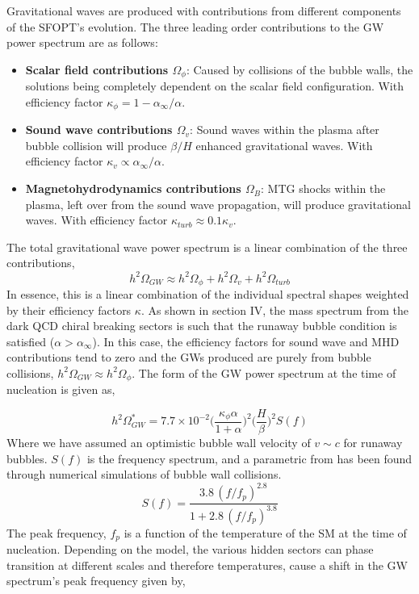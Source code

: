 \documentclass[nofootinbib,twocolumn,preprintnumbers]{revtex4-1}
\begin{document}
Gravitational waves are produced with contributions from different components of the SFOPT's evolution.  The three leading order contributions to the GW power spectrum are as follows:
\begin{itemize}
\item \textbf{Scalar field contributions $\Omega_{\phi}$}: Caused by collisions of the bubble walls, the solutions being completely dependent on the scalar field configuration. With efficiency factor $\kappa_{\phi} = 1 - \alpha_{\infty}/\alpha$.
\item \textbf{Sound wave contributions $\Omega_{v}$}: Sound waves within the plasma after bubble collision will produce $\beta/H$  enhanced gravitational waves. With efficiency factor $\kappa_{v} \propto \alpha_{\infty}/\alpha$.
\item \textbf{Magnetohydrodynamics contributions $\Omega_{B}$}: MTG shocks within the plasma, left over from the sound wave propagation, will produce gravitational waves. With efficiency factor $\kappa_{
turb} \approx 0.1 \kappa_{v} $.
\end{itemize}
The total gravitational wave power spectrum  is a linear combination of the three contributions,
\begin{equation}
h^2\Omega_{GW} \approx h^2\Omega_{\phi} + h^2\Omega_{v} + h^2\Omega_{turb} 
\end{equation}
In essence, this is a linear combination of the individual spectral shapes weighted by their efficiency factors $\kappa$. As shown in section IV, the mass spectrum from the dark QCD chiral breaking sectors is such that the runaway bubble condition is satisfied ($\alpha >\alpha_{\infty}$). In this case, the efficiency factors for sound wave and MHD contributions tend to zero and the GWs produced are purely from bubble collisions, $h^2\Omega_{GW} \approx h^2\Omega_{\phi}$.  The form of the GW power spectrum at the time of nucleation is given as,

\begin{equation}
h^2\Omega_{GW}^* = 7.7\times 10^{-2} \bigg( \frac{\kappa_{\phi} \alpha}{1 + \alpha} \bigg)^2 \bigg( \frac{H}{\beta} \bigg)^2  S(f)
\end{equation}
Where we have assumed an optimistic bubble wall velocity of $v \sim c$ for runaway bubbles. $S(f)$ is the  frequency spectrum, and a parametric from has been found through numerical simulations of bubble wall collisions.
\begin{equation}
S(f) = \frac{3.8 \,(f/f_p)^{2.8}}{1 + 2.8\,(f/f_p)^{3.8}}
\end{equation}
The peak frequency, $f_{p}$ is a function of the temperature of the SM at the time of nucleation. Depending on the model, the various hidden sectors can phase transition at different scales and therefore temperatures, cause a shift in the GW spectrum's peak frequency given by,
\end{document}
